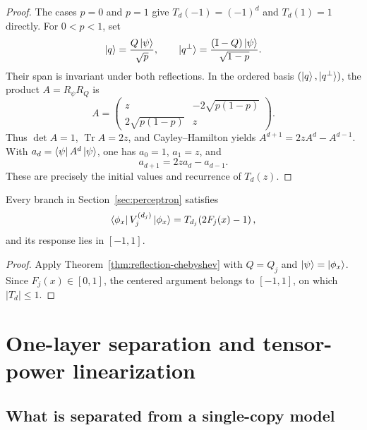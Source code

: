 \documentclass[pdflatex,sn-mathphys,NameDate,iicol]{sn-jnl}
\newcommand{\Tr}{\operatorname{Tr}}
\newcommand{\id}{\mathbb{I}}
\begin{document}
\begin{proof}
The cases $p=0$ and $p=1$ give $T_d(-1)=(-1)^d$ and $T_d(1)=1$
directly. For $0<p<1$, set
\begin{equation}
  \ket q=\frac{Q\ket\psi}{\sqrt p},
  \qquad
  \ket{q^\perp}=\frac{(\id-Q)\ket\psi}{\sqrt{1-p}}.
\end{equation}
Their span is invariant under both reflections. In the ordered basis
$(\ket q,\ket{q^\perp})$, the product $A=R_\psi R_Q$ is
\begin{equation}
  A=
  \begin{pmatrix}
    z & -2\sqrt{p(1-p)}\\
    2\sqrt{p(1-p)} & z
  \end{pmatrix}.
\end{equation}
Thus $\det A=1$, $\Tr A=2z$, and Cayley--Hamilton yields
$A^{d+1}=2zA^d-A^{d-1}$. With
$a_d=\bra\psi A^d\ket\psi$, one has $a_0=1$, $a_1=z$, and
\begin{equation}
  a_{d+1}=2za_d-a_{d-1}.
\end{equation}
These are precisely the initial values and recurrence of $T_d(z)$.
\end{proof}

\begin{corollary}
\label{cor:first-layer}
Every branch in Section~\ref{sec:perceptron} satisfies
\begin{equation}
  \bra{\phi_x}V_j^{(d_j)}\ket{\phi_x}
  =
  T_{d_j}\!\left(2F_j(x)-1\right),
\end{equation}
and its response lies in $[-1,1]$.
\end{corollary}

\begin{proof}
Apply Theorem~\ref{thm:reflection-chebyshev} with
$Q=Q_j$ and $\ket\psi=\ket{\phi_x}$. Since $F_j(x)\in[0,1]$, the
centered argument belongs to $[-1,1]$, on which $|T_d|\le1$.
\end{proof}

\section{One-layer separation and tensor-power linearization}
\label{sec:one-layer-lift}

\subsection{What is separated from a single-copy model}
\end{document}
